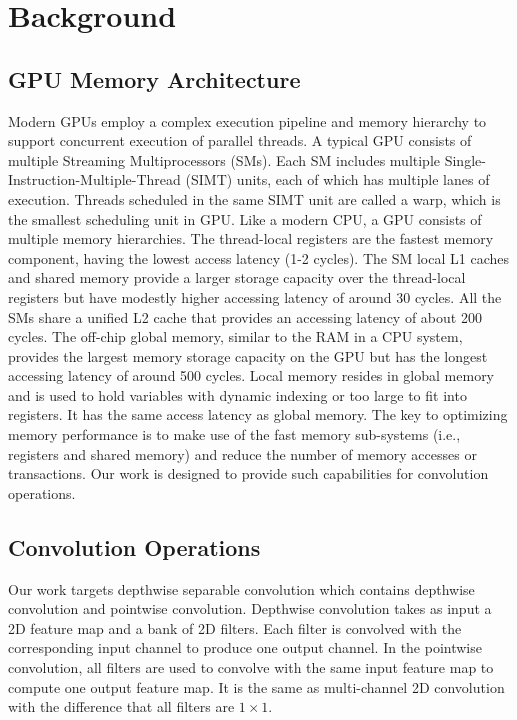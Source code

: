 
\section{Background}
\subsection{GPU Memory Architecture}
Modern GPUs employ a complex execution pipeline and memory hierarchy to support concurrent execution of parallel threads. 
A typical GPU consists of multiple Streaming Multiprocessors (SMs). 
Each SM includes multiple Single-Instruction-Multiple-Thread (SIMT) units, each of which has multiple lanes of execution. 
Threads scheduled in the same SIMT unit are called a warp, which is the smallest scheduling unit in
GPU. 
Like a modern CPU, a GPU consists of multiple memory hierarchies. 
The thread-local registers are the fastest memory component, having the lowest access latency (1-2 cycles). 
The SM local L1 caches and shared memory provide a larger storage capacity over the thread-local
registers but have modestly higher accessing latency of around 30 cycles. All the SMs share a unified L2 cache that provides an accessing
latency of about 200 cycles. The off-chip global memory, similar to the RAM in a CPU system, provides the largest memory storage capacity
on the GPU but has the longest accessing latency of around 500 cycles. Local memory resides in global memory and is used to hold variables with dynamic indexing or too large to fit into registers. It has the same access latency as global memory. The key to optimizing memory performance is to make use of the fast
memory sub-systems (i.e., registers and shared memory) and reduce the number of memory accesses or transactions. Our work is designed to
provide such capabilities for convolution operations.

\subsection{Convolution Operations}

Our work targets depthwise separable convolution which contains depthwise convolution and pointwise convolution. 
Depthwise convolution takes as input a 2D feature map and a bank of 2D filters. Each filter is convolved with the corresponding input channel to produce one output channel. 
In the pointwise convolution, all filters are used to convolve with the same input feature map to compute one output feature map. It is the same as multi-channel 2D convolution with the difference that all filters are $1 \times 1$.


